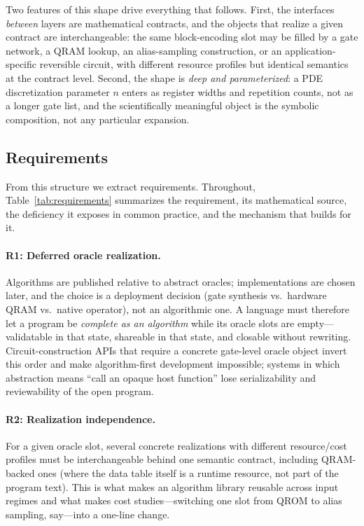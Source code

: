 Two features of this shape drive everything that follows.  First, the
interfaces \emph{between} layers are mathematical contracts, and the objects
that realize a given contract are interchangeable: the same block-encoding
slot may be filled by a gate network, a QRAM lookup, an alias-sampling
construction, or an application-specific reversible circuit, with different
resource profiles but identical semantics at the contract level.  Second, the
shape is \emph{deep and parameterized}: a PDE discretization parameter $n$
enters as register widths and repetition counts, not as a longer gate list,
and the scientifically meaningful object is the symbolic composition, not any
particular expansion.

\subsection{Requirements}
\label{sec:qsc-requirements}

From this structure we extract requirements.  Throughout,
Table~\ref{tab:requirements} summarizes the requirement, its mathematical
source, the deficiency it exposes in common practice, and the mechanism that
\pqlang{} builds for it.

\paragraph{R1: Deferred oracle realization.}
Algorithms are published relative to abstract oracles; implementations are
chosen later, and the choice is a deployment decision (gate synthesis
vs.\ hardware QRAM vs.\ native operator), not an algorithmic one.  A language
must therefore let a program be \emph{complete as an algorithm} while its
oracle slots are empty---validatable in that state, shareable in that state,
and closable without rewriting.  Circuit-construction APIs that require a
concrete gate-level oracle object invert this order and make
algorithm-first development impossible; systems in which abstraction means
``call an opaque host function'' lose serializability and reviewability of
the open program.

\paragraph{R2: Realization independence.}
For a given oracle slot, several concrete realizations with different
resource/cost profiles must be interchangeable behind one semantic contract,
including QRAM-backed ones (where the data table itself is a runtime
resource, not part of the program text).  This is what makes an algorithm
library reusable across input regimes and what makes cost studies---switching
one slot from QROM to alias sampling, say---into a one-line change.

